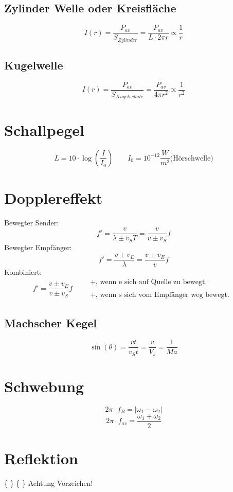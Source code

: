 \subsection{Zylinder Welle oder Kreisfläche}
\[ \boxed{I(r) = \frac{P_{av}}{S_{Zylinder}} = \frac{P_{av}}{L \cdot 2 \pi r} 
\propto \frac{1}{r}} \]
\subsection{Kugelwelle}
\[ \boxed{I(r) = \frac{P_{av}}{S_{Kugelschale}} = \frac{P_{av}}{4 \pi r^2} 
\propto \frac{1}{r^2}} \]

\section{Schallpegel}
\[ \boxed{L = 10 \cdot \log\left(\frac{I}{I_0}\right)} 
\qquad I_0 = 10^{-12} \frac{W}{m^2} \text{(Hörschwelle)} \]

\section{Dopplereffekt}
Bewegter Sender: 
\[ \boxed{f' = \frac{v}{\lambda \pm v_S T} = \frac{v}{v \pm v_S}f} \]
Bewegter Empfänger: 
\[ \boxed{f' = \frac{v \pm v_E}{\lambda} = \frac{v \pm v_E}{v}f} \]
Kombiniert: 
\[ \boxed{f' = \frac{v \pm v_E}{v \pm v_S}f} \qquad \substack{\text{
$+$, wenn e sich auf Quelle zu bewegt. }\\\\\text{
$+$, wenn s sich vom Empfänger weg bewegt. }} \]

\subsection{Machscher Kegel}
\[ \boxed{\sin(\theta) = \frac{v t}{v_S t} = \frac{v}{V_s} = \frac{1}{Ma}} \]

\section{Schwebung}
\[ \boxed{2 \pi \cdot f_B = |\omega_1 - \omega_2|} \]
\[ \boxed{2 \pi \cdot f_{av} = \frac{\omega_1 + \omega_2}{2}} \]

\section{Reflektion}
\{  \}
\{  \}
Achtung Vorzeichen!

